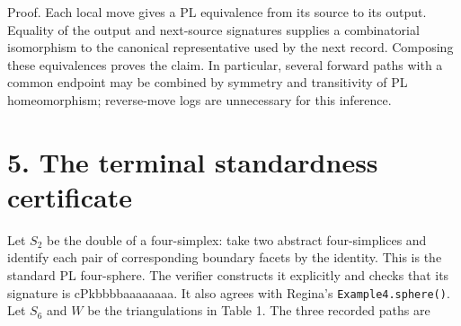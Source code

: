 \documentclass[11pt,letterpaper]{article}
\begin{document}
Proof. Each local move gives a PL equivalence from its source to its output. Equality of the output and next-source signatures supplies a combinatorial isomorphism to the canonical representative used by the next record. Composing these equivalences proves the claim. In particular, several forward paths with a common endpoint may be combined by symmetry and transitivity of PL homeomorphism; reverse-move logs are unnecessary for this inference.

\section*{5. The terminal standardness certificate}
Let $S_2$ be the double of a four-simplex: take two abstract four-simplices and identify each pair of corresponding boundary facets by the identity. This is the standard PL four-sphere. The verifier constructs it explicitly and checks that its signature is \mbox{\small\ttfamily cPkbbbbaaaaaaaa}. It also agrees with Regina's {\small\texttt{Example4.sphere()}}. Let $S_6$ and $W$ be the triangulations in Table 1. The three recorded paths are
\end{document}
